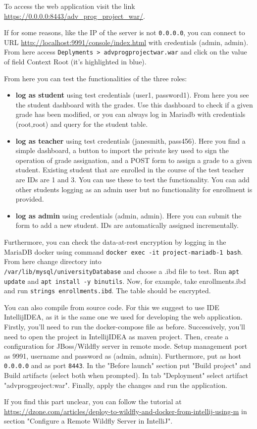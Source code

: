 To access the web application visit the link \url{https://0.0.0.0:8443/adv_prog_project_war/}.

If for some reasons, like the IP of the server is not \texttt{0.0.0.0}, you can connect to URL \url{http://localhost:9991/console/index.html} with credentials (admin, admin). From here access \texttt{Deplyments > adv\textunderscore prog\textunderscore project\textunderscore war.war} and click on the value of field Context Root (it's highlighted in blue).

From here you can test the functionalities of the three roles:

\begin{itemize}
    \item \textbf{log as student} using test credentials (user1, password1). From here you see the student dashboard with the grades. Use this dashboard to check if a given grade has been modified, or you can always log in Mariadb with credentials (root,root) and query for the student table.
    \item \textbf{log as teacher} using test credentials (jane\textunderscore smith, pass456). Here you find a simple dashboard, a button to import the private key used to sign the operation of grade assignation, and a POST form to assign a grade to a given student. Existing student that are enrolled in the course of the test teacher are IDs are 1 and 3. You can use these to test the functionality. You can add other students logging as an admin user but no functionality for enrollment is provided.
    \item \textbf{log as admin} using credentials (admin, admin). Here you can submit the form to add a new student. IDs are automatically assigned incrementally.
\end{itemize}

Furthermore, you can check the data-at-rest encryption by logging in the MariaDB docker using command \texttt{docker exec -it project-mariadb-1 bash}. From here change directory into \\\texttt{/var/lib/mysql/universityDatabase} and choose a .ibd file to test. Run \texttt{apt update} and \texttt{apt install -y binutils}. Now, for example, take enrollments.ibd and run \texttt{strings enrollments.ibd}. The table should be encrypted.

You can also compile from source code. For this we suggest to use IDE IntellijIDEA, as it is the same one we used for developing the web application. Firstly, you'll need to run the docker-compose file as before. Successively, you'll need to open the project in IntellijIDEA as maven project. Then, create a configuration for JBoss/Wildfly server in remote mode. Setup management port as 9991, username and password as (admin, admin). Furthermore, put as host \texttt{0.0.0.0} and as port \texttt{8443}. In the "Before launch" section put "Build project" and Build artifacts (select both when prompted). In tab "Deployment" select artifact "adv\textunderscore prog\textunderscore project:war". Finally, apply the changes and run the application. 

If you find this part unclear, you can follow the tutorial at \url{https://dzone.com/articles/deploy-to-wildfly-and-docker-from-intellij-using-m} in section "Configure a Remote Wildfly Server in IntelliJ".